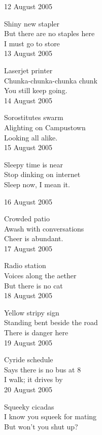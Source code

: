 \documentclass[12pt]{article}
\begin{document}
12 August 2005 

Shiny new stapler \\
But there are no staples here \\
I must go to store \\

13 August 2005

Laserjet printer \\
Chunka-chunka-chunka chunk \\
You still keep going. \\

14 August 2005

Sorostitutes swarm \\
Alighting on Campustown \\
Looking all alike. \\

15 August 2005

Sleepy time is near \\
Stop dinking on internet \\
Sleep now, I mean it. \\



\newpage


16 August 2005

Crowded patio \\
Awash with conversations \\
Cheer is abundant. \\

17 August 2005

Radio station \\
Voices along the aether \\
But there is no cat \\

18 August 2005

Yellow stripy sign \\
Standing bent beside the road \\
There is danger here \\

19 August 2005

Cyride schedule \\
Says there is no bus at 8 \\
I walk; it drives by \\

20 August 2005

Squeeky cicadas \\
I know you squeek for mating \\
But won't you shut up? \\
\end{document}
